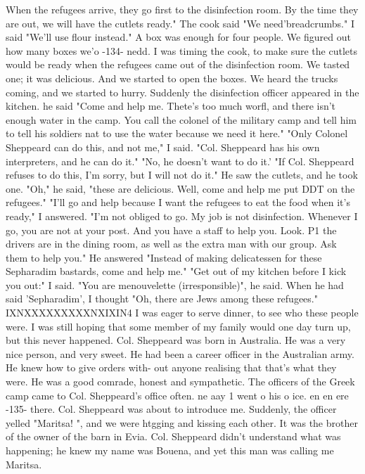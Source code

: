 When the refugees 
arrive, they go first to the disinfection room.
By the time they are out, we will 
have the cutlets ready."
The cook said "We need'breadcrumbs."
I said "We'll use 
flour instead."
A box was enough for four people.
We figured out how many boxes we'o 
-134- 
nedd.
I was timing the cook, to make sure the cutlets would be ready when the refugees 
came out of the disinfection room.
We tasted one; it was delicious.
And we started 
to open the boxes.
We heard the trucks coming, and we started to hurry.
Suddenly 
the disinfection officer appeared in the kitchen.
he said "Come and help me.
Thete's 
too much worfl, and there isn't enough water in the camp.
You call the colonel of the 
military camp and tell him to tell his soldiers nat to use the water because we need 
it here."
"Only Colonel Sheppeard can do this, and not me," I said.
"Col.
Sheppeard has 
his own interpreters, and he can do it."
"No, he doesn't want to do it.'
"If Col.
Sheppeard refuses to do this, I'm sorry, but I will not do it."
He saw the cutlets, and he took one.
"Oh," he said, "these are delicious.
Well, 
come and help me put DDT on the refugees."
"I'll go and help because I want the refugees to eat the food when it's ready," I 
answered.
"I'm not obliged to go.
My job is not disinfection.
Whenever I go, you 
are not at your post.
And you have a staff to help you.
Look.
P1 the drivers are 
in the dining room, as well as the extra man with our group.
Ask them to help you."
He answered "Instead of making delicatessen for these Sepharadim bastards, come 
and help me."
"Get out of my kitchen before I kick you out:" I said.
"You are menouvelette (irresponsible)", he said.
When he had said 'Sepharadim', 
I thought "Oh, there are Jews among these refugees."
IXNXXXXXXXXXNXIXIN4 I was eager 
to serve dinner, to see who these people were.
I was still hoping that some member 
of my family would one day turn up, but this never happened.
Col.
Sheppeard was born in Australia.
He was a very nice person, and very sweet.
He had been a career officer in the Australian army.
He knew how to give orders with-
out anyone realising that that's what they were.
He was a good comrade, honest and 
sympathetic.
The officers of the Greek camp came to Col.
Sheppeard's office often.
ne aay 1 went o his o ice.
en en ere 
-135- 
there.
Col.
Sheppeard was about to introduce me.
Suddenly, the officer yelled 
"Maritsa!
", and we were htgging and kissing each other.
It was the brother of the 
owner of the barn in Evia.
Col.
Sheppeard didn't understand what was happening; he 
knew my name was Bouena, and yet this man was calling me Maritsa.
